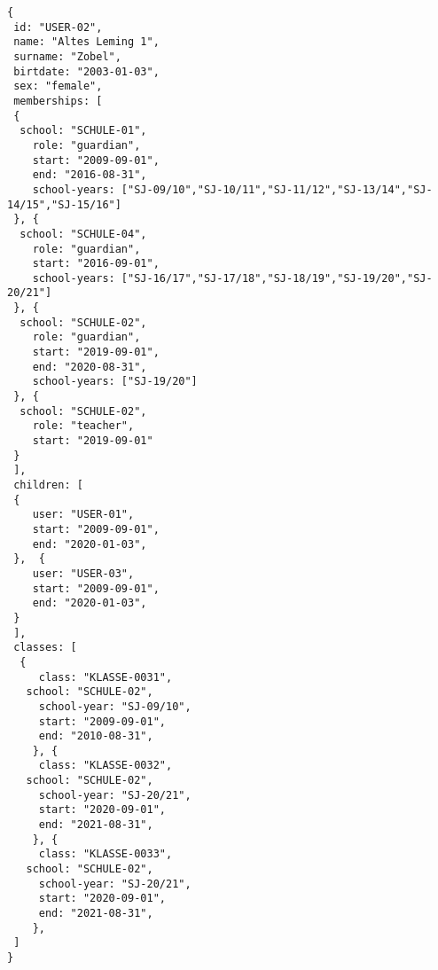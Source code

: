 
\begin{lstlisting}[caption={Beispiel für Benutzer mit Rollen 'teacher' und 'guardian'},frame=tlrb]
{
 id: "USER-02",
 name: "Altes Leming 1",
 surname: "Zobel",
 birtdate: "2003-01-03",
 sex: "female",
 memberships: [
 {
  school: "SCHULE-01",
	role: "guardian",
	start: "2009-09-01",
	end: "2016-08-31",
	school-years: ["SJ-09/10","SJ-10/11","SJ-11/12","SJ-13/14","SJ-14/15","SJ-15/16"]
 }, {
  school: "SCHULE-04",
	role: "guardian",
	start: "2016-09-01",
	school-years: ["SJ-16/17","SJ-17/18","SJ-18/19","SJ-19/20","SJ-20/21"]
 }, {
  school: "SCHULE-02",
	role: "guardian",
	start: "2019-09-01",
	end: "2020-08-31",
	school-years: ["SJ-19/20"]
 }, {
  school: "SCHULE-02",
	role: "teacher",
	start: "2019-09-01"
 }
 ],
 children: [
 {
	user: "USER-01",
	start: "2009-09-01",
	end: "2020-01-03",
 },  {
	user: "USER-03",
	start: "2009-09-01",
	end: "2020-01-03",
 }
 ],
 classes: [
  {
	 class: "KLASSE-0031",
   school: "SCHULE-02",
	 school-year: "SJ-09/10",
	 start: "2009-09-01",
	 end: "2010-08-31",
	}, {
	 class: "KLASSE-0032",
   school: "SCHULE-02",
	 school-year: "SJ-20/21",
	 start: "2020-09-01",
	 end: "2021-08-31",
	}, {
	 class: "KLASSE-0033",
   school: "SCHULE-02",
	 school-year: "SJ-20/21",
	 start: "2020-09-01",
	 end: "2021-08-31",
	}, 
 ]
}
\end{lstlisting}

